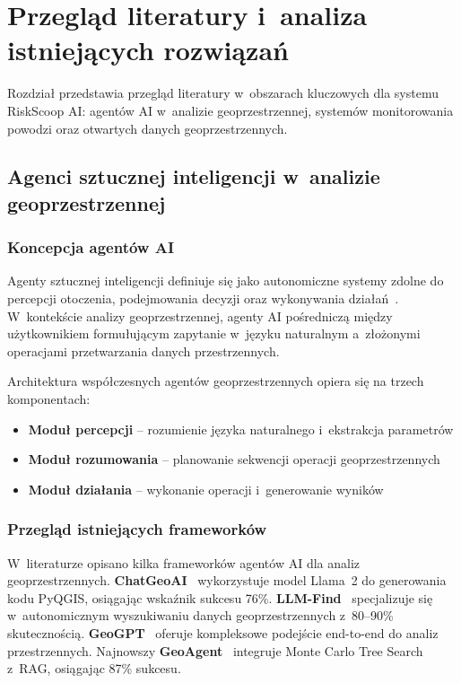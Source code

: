 \section{Przegląd literatury i~analiza istniejących rozwiązań}
\label{chap:pierwszy}

Rozdział przedstawia przegląd literatury w~obszarach kluczowych dla systemu RiskScoop AI: agentów AI w~analizie geoprzestrzennej, systemów monitorowania powodzi oraz otwartych danych geoprzestrzennych.

\subsection{Agenci sztucznej inteligencji w~analizie geoprzestrzennej}

\subsubsection{Koncepcja agentów AI}

Agenty sztucznej inteligencji definiuje się jako autonomiczne systemy zdolne do percepcji otoczenia, podejmowania decyzji oraz wykonywania działań~\cite{google2024geospatial}. W~kontekście analizy geoprzestrzennej, agenty AI pośredniczą między użytkownikiem formułującym zapytanie w~języku naturalnym a~złożonymi operacjami przetwarzania danych przestrzennych.

Architektura współczesnych agentów geoprzestrzennych opiera się na trzech komponentach:
\begin{itemize}
    \item \textbf{Moduł percepcji} -- rozumienie języka naturalnego i~ekstrakcja parametrów
    \item \textbf{Moduł rozumowania} -- planowanie sekwencji operacji geoprzestrzennych
    \item \textbf{Moduł działania} -- wykonanie operacji i~generowanie wyników
\end{itemize}

\subsubsection{Przegląd istniejących frameworków}

W~literaturze opisano kilka frameworków agentów AI dla analiz geoprzestrzennych. \textbf{ChatGeoAI}~\cite{li2024chatgeoai} wykorzystuje model Llama~2 do generowania kodu PyQGIS, osiągając wskaźnik sukcesu 76\%. \textbf{LLM-Find}~\cite{gong2024llmfind} specjalizuje się w~autonomicznym wyszukiwaniu danych geoprzestrzennych z~80--90\% skutecznością. \textbf{GeoGPT}~\cite{rao2024geogpt} oferuje kompleksowe podejście end-to-end do analiz przestrzennych. Najnowszy \textbf{GeoAgent}~\cite{li2024geoagent} integruje Monte Carlo Tree Search z~RAG, osiągając 87\% sukcesu.

